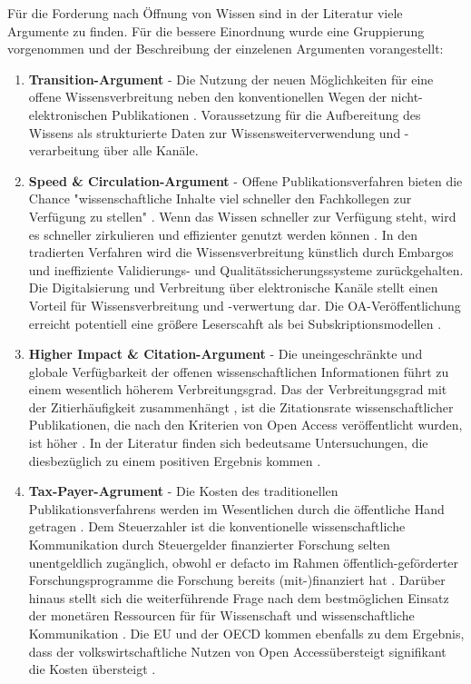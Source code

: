 Für die Forderung nach Öffnung von Wissen sind in der Literatur viele Argumente zu finden. Für die bessere Einordnung wurde eine Gruppierung vorgenommen und der Beschreibung der einzelenen Argumenten vorangestellt:
\begin{enumerate}
\item \textbf{Transition-Argument} - Die Nutzung der neuen Möglichkeiten für eine offene Wissensverbreitung neben den konventionellen Wegen der nicht-elektronischen Publikationen \cite{berliner_erklaerung_2003}. Voraussetzung für die Aufbereitung des Wissens als strukturierte Daten zur Wissensweiterverwendung und -verarbeitung über alle Kanäle.
\item \textbf{Speed & Circulation-Argument} - Offene Publikationsverfahren bieten die Chance "wissenschaftliche Inhalte viel schneller den Fachkollegen zur Verfügung zu stellen" \cite{muller_2010_open}. Wenn das Wissen schneller zur Verfügung steht, wird es schneller zirkulieren und effizienter genutzt werden können \cite{Woelfle_2011}. In den tradierten Verfahren wird die Wissensverbreitung künstlich durch Embargos und ineffiziente Validierungs- und Qualitätssicherungssysteme zurückgehalten. Die Digitalsierung und Verbreitung über elektronische Kanäle stellt einen Vorteil für Wissensverbreitung und -verwertung dar. Die OA-Veröffentlichung erreicht potentiell eine größere Leserscahft als bei Subskriptionsmodellen \cite{cope2014future}. 
\item \textbf{Higher Impact & Citation-Argument} - Die uneingeschränkte und globale Verfügbarkeit der offenen wissenschaftlichen Informationen führt zu einem wesentlich höherem Verbreitungsgrad\cite{muller_2010_open}. Das der Verbreitungsgrad mit der Zitierhäufigkeit zusammenhängt \cite{muller_2010_open}, ist die Zitationsrate wissenschaftlicher Publikationen, die nach den Kriterien von Open Access veröffentlicht wurden, ist höher \cite{cite:21a}. In der Literatur finden sich bedeutsame Untersuchungen, die diesbezüglich zu einem positiven Ergebnis kommen \cite{Lawrence_2001} \cite{Jeffrey_2008} \cite{Eysenbach_2006} \cite{Antelman_2004}.
\item \textbf{Tax-Payer-Agrument} - Die Kosten des traditionellen Publikationsverfahrens werden im Wesentlichen durch die öffentliche Hand getragen \cite{muller_2010_open}. Dem Steuerzahler ist die konventionelle wissenschaftliche Kommunikation durch Steuergelder finanzierter Forschung selten unentgeldlich zugänglich, obwohl er defacto im Rahmen öffentlich-geförderter Forschungsprogramme die Forschung bereits (mit-)finanziert hat \cite{suber_2003_taxpayer} \cite{Adema_2014_open_access}. Darüber hinaus stellt sich die weiterführende Frage nach dem bestmöglichen Einsatz der monetären Ressourcen für für Wissenschaft und wissenschaftliche Kommunikation \cite{Glasziou_2014} \cite{altman_1994_scandal}. Die EU und der OECD kommen ebenfalls zu dem Ergebnis, dass der volkswirtschaftliche Nutzen von Open Accessübersteigt signifikant die Kosten übersteigt \cite{WD_bundestag_2009}. 

\end{enumerate}
